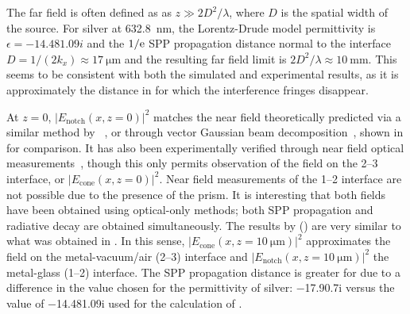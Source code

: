 The far field is often defined as as $z\gg 2 D^2/\lambda$, where $D$ is the
spatial width of the source.  For silver at \SI{632.8}{\nano\meter}, the
Lorentz-Drude
model permittivity is $\epsilon = \num{-14.48+1.09i}$ and the $1/{\mathrm{e}}$ SPP
propagation distance normal to the interface $D = 1/(2 k_x) \approx
\SI{17}{\micro\meter}$ and the resulting far field limit is $2 D^2/\lambda
\approx \SI{10}{\milli\meter}$.  This seems to be consistent with both the
simulated and experimental results, as it is approximately the distance in
 for which the interference fringes disappear.

At $z=0$, $|E_\text{notch}(x,z=0)|^2$ matches the near field theoretically
predicted via a similar method by ~\cite{chuang1986lateral}, or
through vector Gaussian beam decomposition~\cite{baida1999theoretical}, shown
in  for comparison.  It has also been experimentally
verified through near field optical measurements~\cite{dawson2001surface},
though this only permits observation of the field on the 2--3 interface, or
$|E_\text{cone}(x,z=0)|^2$.  Near field measurements of the 1--2 interface are
not possible due to the presence of the prism.  It is interesting that both
fields have been obtained using optical-only methods; both SPP propagation and
radiative decay are obtained simultaneously.  The results by 
() are very similar to what was obtained in
.  In this sense,
$|E_\text{cone}(x,z=\SI{10}{\micro\meter})|^2$ approximates the field on the
metal-vacuum/air (2--3) interface and
$|E_\text{notch}(x,z=\SI{10}{\micro\meter})|^2$ the metal-glass (1--2)
interface.  The SPP propagation distance is greater for  due to a
difference in the value chosen for the permittivity of silver:
\num{-17.9+0.7i} versus the value of \num{-14.48+1.09i} used for the
calculation of .

